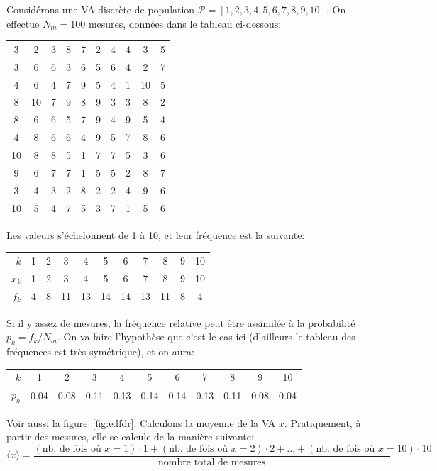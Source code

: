 Considérons une VA discrète de population $\mathcal{P}=[1,2,3,4,5,6,7,8,9,10]$. On effectue $N_m=100$ mesures, données dans le tableau ci-dessous:
\begin{center}
\begin{tabular}{cccccccccc}
 3 &  2 &  3 &  8 &  7 &  2 &  4 &  4 &  3 &  5 \\
 3 &  6 &  6 &  3 &  6 &  5 &  6 &  4 &  2 &  7 \\
 4 &  6 &  4 &  7 &  9 &  5 &  4 &  1 & 10 &  5 \\
 8 & 10 &  7 &  9 &  8 &  9 &  3 &  3 &  8 &  2 \\
 8 &  6 &  6 &  5 &  7 &  9 &  4 &  9 &  5 &  4 \\
 4 &  8 &  6 &  6 &  4 &  9 &  5 &  7 &  8 &  6 \\
10 &  8 &  8 &  5 &  1 &  7 &  7 &  5 &  3 &  6 \\
 9 &  6 &  7 &  7 &  1 &  5 &  5 &  2 &  8 &  7 \\
 3 &  4 &  3 &  2 &  8 &  2 &  2 &  4 &  9 &  6 \\
10 &  5 &  4 &  7 &  5 &  3 &  7 &  1 &  5 &  6
\end{tabular}
\end{center}
Les valeurs s'échelonnent de 1 à 10, et leur fréquence est la suivante:
\begin{center}
\begin{tabular}{r|cccccccccc}
$k$   & 1 & 2 & 3 & 4 & 5 & 6 & 7 & 8 & 9 & 10 \\
$x_k$ & 1 & 2 & 3 & 4 & 5 & 6 & 7 & 8 & 9 & 10 \\
$f_k$ & 4 & 8 & 11 & 13 & 14 & 14 & 13 & 11 & 8 & 4
\end{tabular}
\end{center}
Si il y assez de mesures, la fréquence relative peut être assimilée à la probabilité $p_k=f_k/N_m$. On va faire l'hypothèse que c'est le cas ici (d'ailleurs le tableau des fréquences est très symétrique), et on aura:
\begin{center}
\begin{tabular}{r|cccccccccc}
$k$   & 1 & 2 & 3 & 4 & 5 & 6 & 7 & 8 & 9 & 10 \\
$p_k$ & 0.04 & 0.08 & 0.11 & 0.13 & 0.14 & 0.14 & 0.13 & 0.11 & 0.08 & 0.04
\end{tabular}
\end{center}
Voir aussi la figure~\ref{fig:edfdr}. Calculons la moyenne de la VA $x$. Pratiquement, à partir des mesures, elle se calcule de la manière suivante:
\begin{equation*}
\langle x\rangle=\frac{
(\text{nb. de fois où $x\!=\!1$})\!\cdot\!1 +
(\text{nb. de fois où $x\!=\!2$})\!\cdot\!2 + ... +
(\text{nb. de fois où $x\!=\!10$})\!\cdot\!10}{\text{nombre total de mesures}}
\end{equation*}
